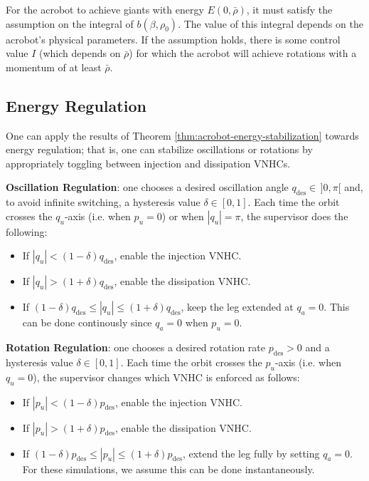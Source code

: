 \documentclass[journal,twoside,web]{ieeecolor}
\begin{document}
{For the acrobot to achieve giants with energy
\(E(0,\bar{\rho})\), it must satisfy the assumption on the integral
of \(b(\beta,\rho_0)\). 
The value of this integral depends on the acrobot's physical parameters.
If the assumption holds, there is some control value \(I\)
(which depends on \(\bar{\rho}\)) for which the acrobot will 
achieve rotations with a momentum of at least \(\bar{\rho}\).

\subsection{Energy Regulation}\label{sec:energy-reg}
One can apply the results of Theorem \ref{thm:acrobot-energy-stabilization} 
towards energy regulation;
that is, one can stabilize oscillations or rotations by appropriately toggling
between injection and dissipation VNHCs.

\textbf{Oscillation Regulation}: one chooses a desired oscillation angle 
\(q_\text{des} \in \, ]0,\pi[\) and, to avoid infinite switching, a
hysteresis value \(\delta \in [0,1]\).
Each time the orbit crosses the \(q_u\)-axis (i.e. when \(p_u = 0\)) or 
when \(|q_u| = \pi\), the supervisor does the following: 
\begin{itemize}
    \item If \(|q_u| < (1-\delta)q_\text{des}\), enable the injection VNHC.
    \item If \(|q_u| > (1+\delta)q_\text{des}\), enable the dissipation VNHC.
    \item If \((1-\delta)q_\text{des} \leq |q_u| \leq (1+\delta)q_\text{des}\),
        keep the leg extended at \(q_a = 0\). This can be done continously since
        \(q_a = 0\) when \(p_u = 0\).
\end{itemize}

\textbf{Rotation Regulation}: one chooses a desired rotation rate 
\(p_\text{des} > 0\) and a hysteresis value \(\delta \in [0,1]\).
Each time the orbit crosses the \(p_u\)-axis (i.e. when \(q_u = 0\)), the
supervisor changes which VNHC is enforced as follows:
\begin{itemize}
    \item If \(|p_u| < (1-\delta)p_\text{des}\), enable the injection VNHC.
    \item If \(|p_u| > (1+\delta)p_\text{des}\), enable the dissipation VNHC.
    \item If \((1-\delta)p_\text{des} \leq |p_u| \leq (1+\delta)p_\text{des}\),
        extend the leg fully by setting \(q_a = 0\).
        For these simulations, we assume this can be done instantaneously.
\end{itemize}

}
\end{document}
